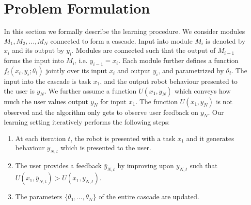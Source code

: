 \section{Problem Formulation}
In this section we formally describe the learning procedure. We consider modules $M_1,M_2,...,M_N$ connected to form a cascade. Input into  module $M_i$ is denoted by $x_i$ and its output by $y_i$.  Modules are connected such that the output of $M_{i-1}$ forms the input into $M_i$, i.e. $y_{i-1} = x_i$. Each module further defines a function $f_i(x_i,y_i;\theta_i)$ jointly over its input $x_i$ and output $y_i$, and parametrized by $\theta_i$. The input into the cascade is task $x_1$, and the output robot behaviour presented to the user is $y_N$. 	We further assume a function $U(x_1,y_N)$ which conveys how much the user values output $y_N$ for input $x_1$. The function $U(x_1,y_N)$ is not observed and the algorithm only gets to observe user feedback on $y_N$. Our learning setting iteratively performs the following steps:
\begin{enumerate}
\item At each iteration $t$, the robot is presented with a task $x_1$ and it generates behaviour $y_{N,t}$ which is presented to the user.
\item The user provides a feedback $\bar{y}_{N,t}$ by improving upon ${y}_{N,t}$ such that $U(x_1,\bar{y}_{N,t}) > U(x_1,{y}_{N,t})$.
\item The parameters $\{\theta_1,...,\theta_N\}$ of the entire cascade are updated.
\end{enumerate} 

